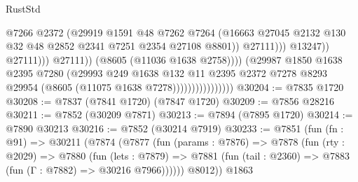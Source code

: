 \begin{lexlean}{RustStd}
\begin{coremodule}
                                                    @7266
                                                    @2372
                                                    (@29919
                                                      @1591
                                                      @48
                                                      @7262
                                                      @7264
                                                      (@16663
                                                        @27045
                                                        @2132
                                                        @130
                                                        @32
                                                        @48
                                                        @2852
                                                        @2341
                                                        @7251
                                                        @2354
                                                        @27108
                                                        @8801))
                                                    @27111)))
                                              @13247))
                                          @27111)))
                                    @27111))
                                (@8605 (@11036 @1638 @2758))))
                            (@29987
                              @1850
                              @1638
                              @2395
                              @7280
                              (@29993
                                @249
                                @1638
                                @132
                                @11
                                @2395
                                @2372
                                @7278
                                @8293
                                @29954
                                (@8605 (@11075 @1638 @7278))))))))))))))))
@30204 := @7835 @1720
@30208 := @7837 (@7841 @1720) (@7847 @1720)
@30209 := @7856 @28216
@30211 := @7852 (@30209 @7871)
@30213 := @7894 (@7895 @1720)
@30214 := @7890 @30213
@30216 := @7852 (@30214 @7919)
@30233 := @7851
    (fun (fn : @91) =>
    @30211
      (@7874
        (@7877
          (fun (params : @7876) =>
          @7878
            (fun (rty : @2029) =>
            @7880
              (fun (lets : @7879) =>
              @7881 (fun (tail : @2360) => @7883 (fun (Γ : @7882) => @30216 @7966))))))
        @8012))
    @1863

\end{coremodule}
\end{lexlean}
